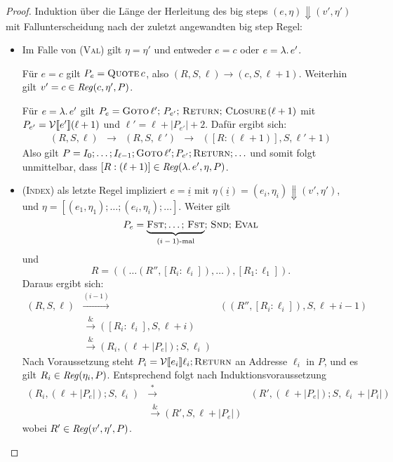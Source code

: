\documentclass[12pt,fleqn,a4paper]{article}
\newcommand{\RN}[1]{\mbox{\textsc{(#1)}}}
\begin{document}
\begin{proof}
  Induktion \"uber die L\"ange der Herleitung des big steps $(e,\eta) \Downarrow (v',\eta')$ mit Fallunterscheidung
  nach der zuletzt angewandten big step Regel:
  \begin{itemize}
  \item Im Falle von \RN{Val} gilt $\eta=\eta'$ und entweder $e = c$ oder $e = \lambda .\,e'$.

    F\"ur $e = c$ gilt $P_e = \textsc{Quote}\,c$, also
    $(R,S,\ell) \to (c,S,\ell+1)$. Weiterhin gilt $v' = c \in {\text{\it Reg\/}}(c,\eta',P)$.

    F\"ur $e = \lambda .\,e'$ gilt $P_e = \textsc{Goto}\,\ell';\,P_{e'};\,\textsc{Return};\,\textsc{Closure}\,(\ell+1)$
    mit $P_{e'} = \mathcal{V}\llbracket e' \rrbracket(\ell+1)$ und $\ell' = \ell + |P_{e'}| + 2$. Daf\"ur ergibt sich:
    \[\begin{array}{rcccl}
      (R,S,\ell) &\to& (R,S,\ell') &\to& ([R:(\ell+1)],S,\ell'+1)
    \end{array}\]
    Also gilt $P = I_0;\ldots;I_{\ell-1};\textsc{Goto}\,\ell';P_{e'};\textsc{Return};\ldots$ und somit folgt
    unmittelbar, dass $[R:(\ell+1)]\in{\text{\it Reg\/}}(\lambda .\,e',\eta,P)$.

  \item \RN{Index} als letzte Regel impliziert $e = \underline{i}$ mit
    $\eta(\underline{i}) = (e_i,\eta_i) \Downarrow (v',\eta')$, und $\eta = [(e_1,\eta_1);\ldots;(e_i,\eta_i);\ldots]$.
    Weiter gilt
    \[P_e = \underbrace{\textsc{Fst};\ldots;\,\textsc{Fst}}_{\text{$(i-1)$-mal}};\,\textsc{Snd};\,\textsc{Eval}\]
    und
    \[R = ((\ldots(R'',[R_i:\ell_i]),\ldots),[R_1:\ell_1]).\]
    Daraus ergibt sich:
    \[\begin{array}{rcl}
      (R,S,\ell)
      &\xrightarrow{(i-1)}& ((R'',[R_i:\ell_i]),S,\ell+i-1) \\
      &\xrightarrow& ([R_i:\ell_i],S,\ell+i) \\
      &\xrightarrow& (R_i,(\ell+|P_e|);S,\ell_i)
    \end{array}\]
    Nach Voraussetzung steht $P_i=\mathcal{V}\llbracket e_i \rrbracket\ell_i;\textsc{Return}$ an Addresse $\ell_i$ in $P$, und
    es gilt $R_i \in {\text{\it Reg\/}}(\eta_i,P)$. Entsprechend folgt nach Induktionsvoraussetzung
    \[\begin{array}{rcl}
      (R_i,(\ell+|P_e|);S,\ell_i)
      &\xrightarrow*& (R',(\ell+|P_e|);S,\ell_i+|P_i|) \\
      &\xrightarrow& (R',S,\ell+|P_e|)
    \end{array}\]
    wobei $R'\in{\text{\it Reg\/}}(v',\eta',P)$.


\end{itemize}
\end{proof}
\end{document}
